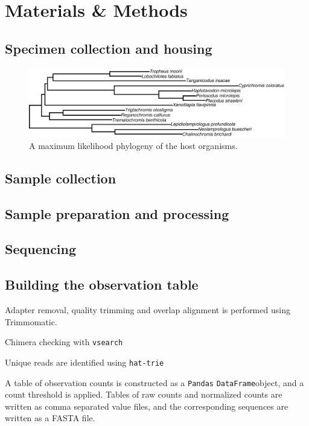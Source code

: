 \section{Materials \& Methods}

\subsection{Specimen collection and housing}




\begin{figure}
    \includegraphics[width=\textwidth]{FishPoo/figures/mcgee_tree.pdf}
    \caption{A maximum likelihood phylogeny of the host organisms.}
    \label{FP_host_tree}
\end{figure}

\subsection{Sample collection}

\subsection{Sample preparation and processing}

\subsection{Sequencing}

\subsection{Building the observation table}

Adapter removal, quality trimming and overlap alignment is performed using Trimmomatic.

Chimera checking with {\tt vsearch}

Unique reads are identified using {\tt hat-trie}

A table of observation counts is constructed as a {\tt Pandas} {\tt DataFrame}object, and a count threshold is applied. Tables of raw counts and normalized counts are written as comma separated value files, and the corresponding sequences are written as a FASTA file.

